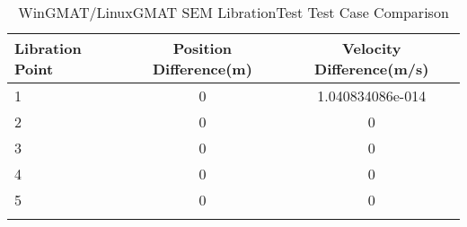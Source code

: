 \begin{table}[htbp!]
\centering
\caption{ WinGMAT/LinuxGMAT SEM LibrationTest Test Case Comparison}
      \begin{tabular}{lcc}
      \hline\hline
          Libration Point & Position Difference(m) & Velocity Difference(m/s) \\
         \hline
         1 & 0 & 1.040834086e-014 \\
         2 & 0 & 0 \\
         3 & 0 & 0 \\
         4 & 0 & 0 \\
         5 & 0 & 0 \\
      \hline\hline
      \label{Table: WinGMAT-LinuxGMAT SEM LibrationTest Table} 
\end{tabular}
\end{table}
